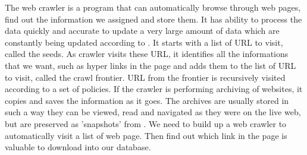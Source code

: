 	
	The web crawler is a program that can automatically browse through web pages, find out the information we assigned and store them.
	It has ability to process the data quickly and accurate to update a very large amount of data which are constantly being updated according to \cite{Liu2012}.
	It starts with a list of URL to visit, called the seeds.
	As crawler visits these URL, it identifies all the informations that we want, such as hyper links in the page and adds them to the list of URL to visit, called the crawl frontier.
	URL from the frontier is recursively visited according to a set of policies.
	If the crawler is performing archiving of websites, it copies and saves the information as it goes.
	The archives are usually stored in such a way they can be viewed, read and navigated as they were on the live web, but are preserved as 'snapshots' from \cite{Du2013}.
	We need to build up a web crawler to automatically visit a list of web page.
	Then find out which link in the page is valuable to download into our database.
	
	

\newpage %
